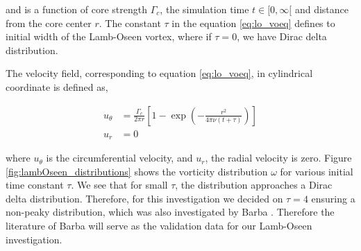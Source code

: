 and is a function of core strength $\Gamma_c$, the simulation time $t \in [0,\infty[$ and distance from the core center $r$. The constant $\tau$ in the equation \ref{eq:lo_voeq} defines to initial width of the Lamb-Oseen vortex, where if $\tau=0$, we have Dirac delta distribution.

The velocity field, corresponding to equation \ref{eq:lo_voeq}, in cylindrical coordinate is defined as,

	\begin{subequations}
	\begin{align}
	u_{\theta} &= \frac{\Gamma_c}{2\pi r} \left[1-\exp\left(-\frac{r^2}{4\pi\nu(t+\tau)}\right)\right]\\
	u_r &= 0
	\end{align}
	\label{eq:lo_veeq}
	\end{subequations}

where $u_{\theta}$ is the circumferential velocity, and $u_r$, the radial velocity is zero. Figure \ref{fig:lambOseen_distributions} shows the vorticity distribution $\omega$ for various initial time constant $\tau$. We see that for small $\tau$, the distribution approaches a Dirac delta distribution. Therefore, for this investigation we decided on $\tau=4$ ensuring a non-peaky distribution, which was also investigated by Barba \cite{Barba2004c}.  Therefore the literature of Barba \cite{Barba2004c} will serve as the validation data for our Lamb-Oseen investigation.


%        
%        

